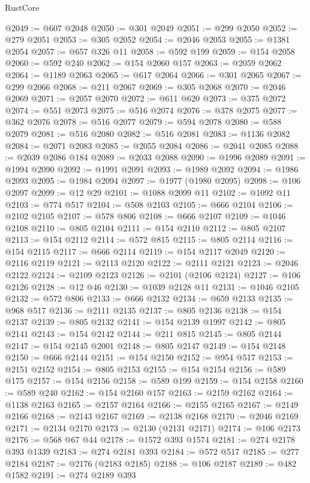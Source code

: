 \begin{lexlean}{RustCore}
\begin{coremodule}
@2049 := @607 @2048
@2050 := @301 @2049
@2051 := @299 @2050
@2052 := @279 @2051
@2053 := @305 @2052
@2054 := @2046 @2053
@2055 := @1381 @2054
@2057 := @657 @326 @11
@2058 := @592 @199
@2059 := @154 @2058
@2060 := @592 @240
@2062 := @154 @2060 @157
@2063 := @2059 @2062
@2064 := @1189 @2063
@2065 := @617 @2064
@2066 := @301 @2065
@2067 := @299 @2066
@2068 := @211 @2067
@2069 := @305 @2068
@2070 := @2046 @2069
@2071 := @2057 @2070
@2072 := @611 @620
@2073 := @375 @2072
@2074 := @551 @2073
@2075 := @516 @2074
@2076 := @378 @2075
@2077 := @362 @2076
@2078 := @516 @2077
@2079 := @594 @2078
@2080 := @588 @2079
@2081 := @516 @2080
@2082 := @516 @2081
@2083 := @1136 @2082
@2084 := @2071 @2083
@2085 := @2055 @2084
@2086 := @2041 @2085
@2088 := @2039 @2086 @184
@2089 := @2033 @2088
@2090 := @1996 @2089
@2091 := @1994 @2090
@2092 := @1991 @2091
@2093 := @1989 @2092
@2094 := @1986 @2093
@2095 := @1984 @2094
@2097 := @1977 (@1980 @2095)
@2098 := @106 @2097
@2099 := @12 @29
@2101 := @1088 @2099 @11
@2102 := @1092 @11
@2103 := @774 @517
@2104 := @508 @2103
@2105 := @666 @2104
@2106 := @2102 @2105
@2107 := @578 @806
@2108 := @666 @2107
@2109 := @1046 @2108
@2110 := @805 @2104
@2111 := @154 @2110
@2112 := @805 @2107
@2113 := @154 @2112
@2114 := @572 @815
@2115 := @805 @2114
@2116 := @154 @2115
@2117 := @666 @2114
@2119 := @154 @2117 @2049
@2120 := @2116 @2119
@2121 := @2113 @2120
@2122 := @2111 @2121
@2123 := @2046 @2122
@2124 := @2109 @2123
@2126 := @2101 (@2106 @2124)
@2127 := @106 @2126
@2128 := @12 @46
@2130 := @1039 @2128 @11
@2131 := @1046 @2105
@2132 := @572 @806
@2133 := @666 @2132
@2134 := @659 @2133
@2135 := @968 @517
@2136 := @2111 @2135
@2137 := @805 @2136
@2138 := @154 @2137
@2139 := @805 @2132
@2141 := @154 @2139 @1997
@2142 := @805 @2141
@2143 := @154 @2142
@2144 := @211 @815
@2145 := @805 @2144
@2147 := @154 @2145 @2001
@2148 := @805 @2147
@2149 := @154 @2148
@2150 := @666 @2144
@2151 := @154 @2150
@2152 := @954 @517
@2153 := @2151 @2152
@2154 := @805 @2153
@2155 := @154 @2154
@2156 := @589 @175
@2157 := @154 @2156
@2158 := @589 @199
@2159 := @154 @2158
@2160 := @589 @240
@2162 := @154 @2160 @157
@2163 := @2159 @2162
@2164 := @1138 @2163
@2165 := @2157 @2164
@2166 := @2155 @2165
@2167 := @2149 @2166
@2168 := @2143 @2167
@2169 := @2138 @2168
@2170 := @2046 @2169
@2171 := @2134 @2170
@2173 := @2130 (@2131 @2171)
@2174 := @106 @2173
@2176 := @568 @67 @44
@2178 := @1572 @393 @1574
@2181 := @274 @2178 @393 @1339
@2183 := @274 @2181 @393
@2184 := @572 @517
@2185 := @277 @2184
@2187 := @2176 (@2183 @2185)
@2188 := @106 @2187
@2189 := @482 @1582
@2191 := @274 @2189 @393

\end{coremodule}
\end{lexlean}
